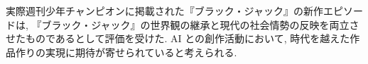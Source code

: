 \documentclass[a4j,12pt]{jsreport}
\begin{document}
実際週刊少年チャンピオンに掲載された『ブラック・ジャック』の新作エピソードは, 『ブラック・ジャック』の世界観の継承と現代の社会情勢の反映を両立させたものであるとして評価を受けた. AI との創作活動において, 時代を越えた作品作りの実現に期待が寄せられていると考えられる.


\vspace{5cm}
\end{document}
